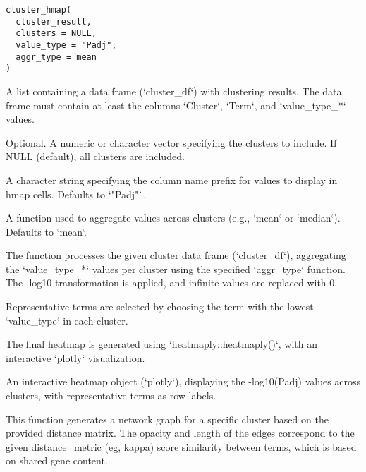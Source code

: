 \documentclass[a4paper]{book}
\begin{document}
%
\begin{Usage}
\begin{verbatim}
cluster_hmap(
  cluster_result,
  clusters = NULL,
  value_type = "Padj",
  aggr_type = mean
)
\end{verbatim}
\end{Usage}
%
\begin{Arguments}
\begin{ldescription}
\item[\code{cluster\_result}] A list containing a data frame (`cluster\_df`) with clustering results.
The data frame must contain at least the columns `Cluster`, `Term`, and `value\_type\_*` values.

\item[\code{clusters}] Optional. A numeric or character vector specifying the clusters to include.
If NULL (default), all clusters are included.

\item[\code{value\_type}] A character string specifying the column name prefix for values to display in hmap cells.
Defaults to `"Padj"`.

\item[\code{aggr\_type}] A function used to aggregate values across clusters (e.g., `mean` or `median`).
Defaults to `mean`.
\end{ldescription}
\end{Arguments}
%
\begin{Details}
The function processes the given cluster data frame (`cluster\_df`),
aggregating the `value\_type\_*` values per cluster using the specified `aggr\_type` function.
The -log10 transformation is applied, and infinite values are replaced with 0.

Representative terms are selected by choosing the term with the lowest
`value\_type` in each cluster.

The final heatmap is generated using `heatmaply::heatmaply()`, with
an interactive `plotly` visualization.
\end{Details}
%
\begin{Value}
An interactive heatmap object (`plotly`), displaying the -log10(Padj) values
across clusters, with representative terms as row labels.
\end{Value}
%
\begin{Description}
This function generates a network graph for a specific cluster based on the provided distance matrix.
The opacity and length of the edges correspond to the given distance\_metric (eg, kappa) score similarity 
between terms, which is based on shared gene content.
\end{Description}
\end{document}
